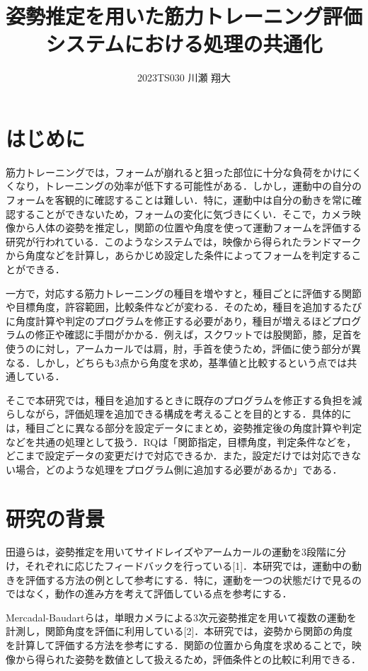 \documentclass[no-page-number]{nanzan-abstract}
\title{姿勢推定を用いた筋力トレーニング評価システムにおける処理の共通化}
\author{2023TS030 川瀬 翔大}
\begin{document}
\maketitle

\section{はじめに}

筋力トレーニングでは，フォームが崩れると狙った部位に十分な負荷をかけにくくなり，トレーニングの効率が低下する可能性がある．しかし，運動中の自分のフォームを客観的に確認することは難しい．特に，運動中は自分の動きを常に確認することができないため，フォームの変化に気づきにくい．そこで，カメラ映像から人体の姿勢を推定し，関節の位置や角度を使って運動フォームを評価する研究が行われている．このようなシステムでは，映像から得られたランドマークから角度などを計算し，あらかじめ設定した条件によってフォームを判定することができる．

一方で，対応する筋力トレーニングの種目を増やすと，種目ごとに評価する関節や目標角度，許容範囲，比較条件などが変わる．そのため，種目を追加するたびに角度計算や判定のプログラムを修正する必要があり，種目が増えるほどプログラムの修正や確認に手間がかかる．例えば，スクワットでは股関節，膝，足首を使うのに対し，アームカールでは肩，肘，手首を使うため，評価に使う部分が異なる．しかし，どちらも3点から角度を求め，基準値と比較するという点では共通している．

そこで本研究では，種目を追加するときに既存のプログラムを修正する負担を減らしながら，評価処理を追加できる構成を考えることを目的とする．具体的には，種目ごとに異なる部分を設定データにまとめ，姿勢推定後の角度計算や判定などを共通の処理として扱う．RQは「関節指定，目標角度，判定条件などを，どこまで設定データの変更だけで対応できるか．また，設定だけでは対応できない場合，どのような処理をプログラム側に追加する必要があるか」である．


\section{研究の背景}

田邉らは，姿勢推定を用いてサイドレイズやアームカールの運動を3段階に分け，それぞれに応じたフィードバックを行っている[1]．本研究では，運動中の動きを評価する方法の例として参考にする．特に，運動を一つの状態だけで見るのではなく，動作の進み方を考えて評価している点を参考にする．

Mercadal-Baudartらは，単眼カメラによる3次元姿勢推定を用いて複数の運動を計測し，関節角度を評価に利用している[2]．本研究では，姿勢から関節の角度を計算して評価する方法を参考にする．関節の位置から角度を求めることで，映像から得られた姿勢を数値として扱えるため，評価条件との比較に利用できる．
\end{document}
